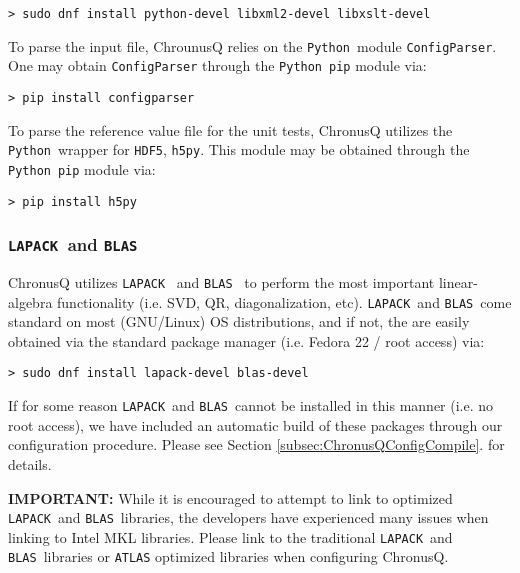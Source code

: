 \documentclass[12pt]{article}
\newcommand{\HDF}{\texttt{HDF5}}
\newcommand{\LAPACK}{\texttt{LAPACK}}
\newcommand{\BLAS}{\texttt{BLAS}}
\newcommand{\Python}{\texttt{Python}}
\newcounter{subsubsubsection}[subsubsection]
\begin{document}
	\begin{lstlisting}
> sudo dnf install python-devel libxml2-devel libxslt-devel
	\end{lstlisting}

         \label{subsubsubsec:CP}
        \noindent To parse the input file, ChrounusQ relies on the \Python~module 
	\texttt{ConfigParser}. One may obtain \texttt{ConfigParser} through
	the \Python~\texttt{pip} module via:
	 
	\begin{lstlisting}
> pip install configparser
	\end{lstlisting}

         \label{subsubsubsec:H5Py}
        \noindent To parse the reference value file for the unit tests,
        ChronusQ utilizes the \Python~wrapper for \HDF, \texttt{h5py}. This module
        may be obtained through the \Python~\texttt{pip} module via:

	\begin{lstlisting}
> pip install h5py
	\end{lstlisting}


      \subsubsection{\LAPACK~and \BLAS} \label{subsubsec:LA} 
        ChronusQ utilizes \LAPACK~\cite{lapack} and \BLAS~\cite{blas1,blas2,blas3,atlas} to perform
        the most important linear-algebra functionality (i.e. SVD, QR, 
	diagonalization, etc). \LAPACK~and \BLAS~come standard on most
	(GNU/Linux) OS distributions, and if not, the are easily obtained via
	the standard package manager (i.e. Fedora 22 / root access) via:

	\begin{lstlisting}
> sudo dnf install lapack-devel blas-devel
	\end{lstlisting}

	\noindent If for some reason \LAPACK~and \BLAS~cannot be installed in this 
	manner (i.e. no root access), we have included an automatic build of these 
	packages through our configuration procedure. Please see Section 
	\ref{subsec:ChronusQConfigCompile}. for details.

	\noindent \textbf{IMPORTANT:} While it is encouraged to attempt to link to 
	optimized \LAPACK~and \BLAS~libraries, the developers have experienced many 
	issues when linking to Intel MKL libraries. Please link to the traditional 
	\LAPACK~and \BLAS~libraries or \texttt{ATLAS} optimized libraries when 
	configuring ChronusQ.
\end{document}
